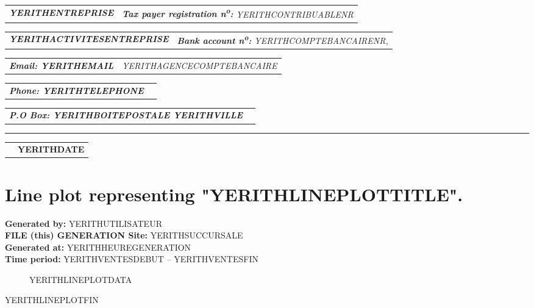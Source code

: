 \documentclass[11pt,a4paper]{article} %
\makeatletter
\newcommand{\headerrow}[2]
{\begin{tabular*}{\linewidth}{l@{\extracolsep{\fill}}r}
#1 &
#2 \\
\end{tabular*}}
\newcommand{\emphbold}[1]{\textbf{\emph{#1}}\xspace}
\makeatother
\begin{document}
\bigskip

\headerrow
	{\emphbold{YERITHENTREPRISE}}
	{\emph{\textbf{Tax payer registration n\textsuperscript{o}:} YERITHCONTRIBUABLENR}}
\headerrow
	{\emphbold{YERITHACTIVITESENTREPRISE}}
	{\emph{\textbf{Bank account n\textsuperscript{o}:} YERITHCOMPTEBANCAIRENR,}}
\headerrow
	{\emphbold{Email: YERITHEMAIL}}
	{\emph{YERITHAGENCECOMPTEBANCAIRE}}
\headerrow
	{\emphbold{Phone: YERITHTELEPHONE}}
	{}
\headerrow
	{\emphbold{P.O Box: YERITHBOITEPOSTALE YERITHVILLE}}
	{}

\hrule

\headerrow
	{}
	{\textbf{YERITHDATE}}


\section*{Line plot representing "YERITHLINEPLOTTITLE".}
\textbf{Generated by:} YERITHUTILISATEUR\\
\textbf{FILE (this) GENERATION Site:} YERITHSUCCURSALE\\
\textbf{Generated at:} YERITHHEUREGENERATION\\
\textbf{Time period:} YERITHVENTESDEBUT -- YERITHVENTESFIN


\begin{figure}[!htbp]
\setlength{\DTLbaroutlinewidth}{1pt}
\centering
YERITHLINEPLOTDATA
\end{figure}


YERITHLINEPLOTFIN
\end{document}
